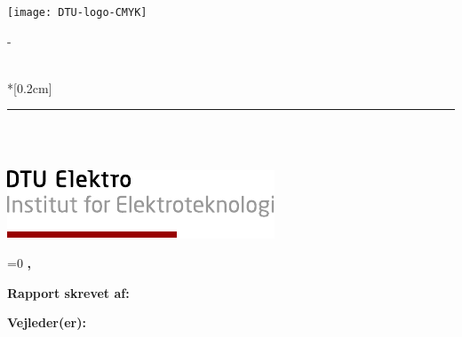\calccentering{\unitlength}
\begin{titlingpage}
\thispagestyle{empty}
\sffamily
\vspace*{-2.8cm}
\hfill\texttt{[image: DTU-logo-CMYK]}
\begin{adjustwidth*}{\unitlength}{-\unitlength}
    \begin{adjustwidth}{-0.5cm}{-0.5cm}
		\noindent
		
		
		\noindent\textbf{\Huge\ThTitle} \\*[0.2cm]
		\textcolor{dtured}{\rule{\textwidth + 1.5cm}{4pt}}
		\begin{flushleft}
		\Large
            \ThAuthors\\
            \thesistype{}\\
            \ThYear
        \end{flushleft}
		\noindent
		\vspace{-1.8cm}
		\includegraphics[]{graphics/tex_dtu_elektro_a}
	\end{adjustwidth}
\end{adjustwidth*}
	\cleartoevenpage
		\thispagestyle{empty}
		\ifnum\pdfstrcmp{\ThSubtitle}{}=0 %
		\noindent\textbf{\ThTitle}
		\else
		\noindent\textbf{\ThTitle, \ThSubtitle}
		\fi

		\noindent\textbf{Rapport skrevet af:}\\
		\ThAuthors


		\noindent\textbf{Vejleder(er):}\\
		\ThSupervisors


		\noindent\ThDepartment



\end{titlingpage}
